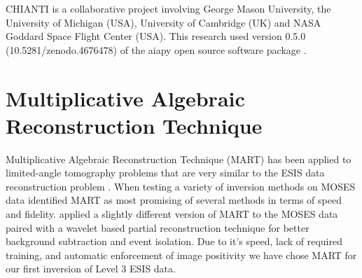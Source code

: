 	

\begin{acknowledgements}
	CHIANTI is a collaborative project involving George Mason University, the University of Michigan (USA), University of Cambridge (UK) and NASA Goddard Space Flight Center (USA).
	This research used version 0.5.0 (10.5281/zenodo.4676478) of the aiapy open source software package \citep{aiapy}.
	
	
\end{acknowledgements}



\appendix
\section{Multiplicative Algebraic Reconstruction Technique}\label{MART}
	Multiplicative Algebraic Reconstruction Technique (MART) has been applied to limited-angle tomography problems that are very similar to the ESIS data reconstruction problem \citep{Okamoto1991,Verhoeven1993}.
	When testing a variety of inversion methods on MOSES data \citet{FoxPhD} identified MART as most promising of several methods in terms of speed and fidelity.
	\citet{RustPhD} applied a slightly different version of MART to the MOSES data paired with a wavelet based partial reconstruction technique for better background subtraction and event isolation.
	Due to it's speed, lack of required training, and automatic enforcement of image positivity we have chose MART for our first inversion of Level 3 ESIS data.
	
